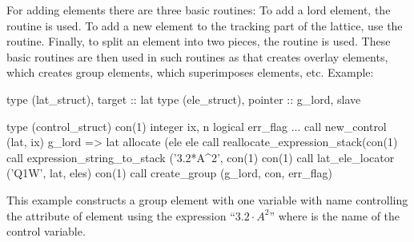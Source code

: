 For adding elements there are three basic routines: To add a lord
element, the  routine is used.
To add a new element to the tracking part of the lattice, use the
 routine. Finally, to split
an element into two pieces, the routine
 is used. These basic routines are
then used in such routines as
 that creates overlay
elements,  which creates group
elements,  which
superimposes elements, etc. Example:
\begin{example}
  type (lat_struct), target :: lat
  type (ele_struct), pointer :: g_lord, slave

  type (control_struct) con(1)
  integer ix, n
  logical err_flag
  ...
  call new_control (lat, ix)
  g_lord => lat%
  allocate (ele%
  ele%
  call reallocate_expression_stack(con(1)%
  call expression_string_to_stack ('3.2*A^2', con(1)%
  con(1)%
  call lat_ele_locator ('Q1W', lat, eles)
  con(1)%
  call create_group (g_lord, con, err_flag)
\end{example}
This example constructs a group element with one variable with name
 controlling the  attribute of element  using the
expression ``$3.2 \cdot A^2$'' where  is the name of the control
variable.

